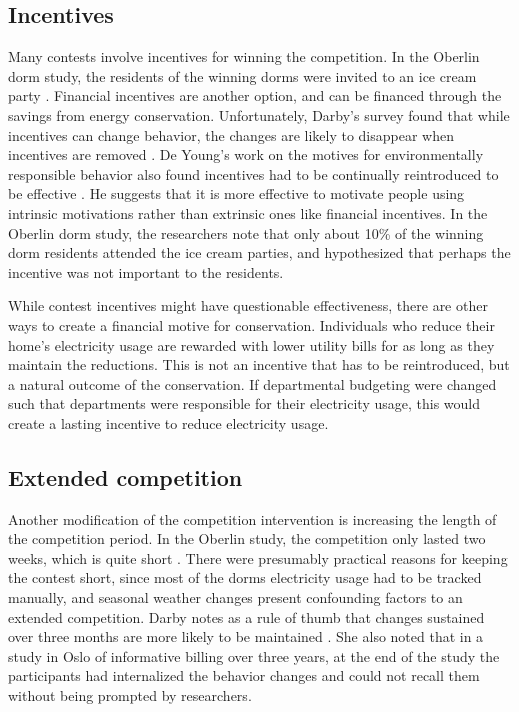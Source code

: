 \documentclass[11pt]{article}
\begin{document}
\subsection{Incentives}
\label{sec:incentives}

Many contests involve incentives for winning the competition. In the Oberlin dorm study, the residents of the winning dorms were invited to an ice cream party \cite{petersen-dorm-energy-reduction}. Financial incentives are another option, and can be financed through the savings from energy conservation. Unfortunately, Darby's survey found that while incentives can change behavior, the changes are likely to disappear when incentives are removed \cite{darby-review-2006}. De Young's work on the motives for environmentally responsible behavior also found incentives had to be continually reintroduced to be effective \cite{Young:2000fv}. He suggests that it is more effective to motivate people using intrinsic motivations rather than extrinsic ones like financial incentives. In the Oberlin dorm study, the researchers note that only about 10\% of the winning dorm residents attended the ice cream parties, and hypothesized that perhaps the incentive was not important to the residents.

While contest incentives might have questionable effectiveness, there are other ways to create a financial motive for conservation. Individuals who reduce their home's electricity usage are rewarded with lower utility bills for as long as they maintain the reductions. This is not an incentive that has to be reintroduced, but a natural outcome of the conservation. If departmental budgeting were changed such that departments were responsible for their electricity usage, this would create a lasting incentive to reduce electricity usage.

\subsection{Extended competition}

Another modification of the competition intervention is increasing the length of the competition period. In the Oberlin study, the competition only lasted two weeks, which is quite short \cite{petersen-dorm-energy-reduction}. There were presumably practical reasons for keeping the contest short, since most of the dorms electricity usage had to be tracked manually, and seasonal weather changes present confounding factors to an extended competition. Darby notes as a rule of thumb that changes sustained over three months are more likely to be maintained \cite{darby-review-2006}. She also noted that in a study in Oslo of informative billing over three years, at the end of the study the participants had internalized the behavior changes and could not recall them without being prompted by researchers.
\end{document}
